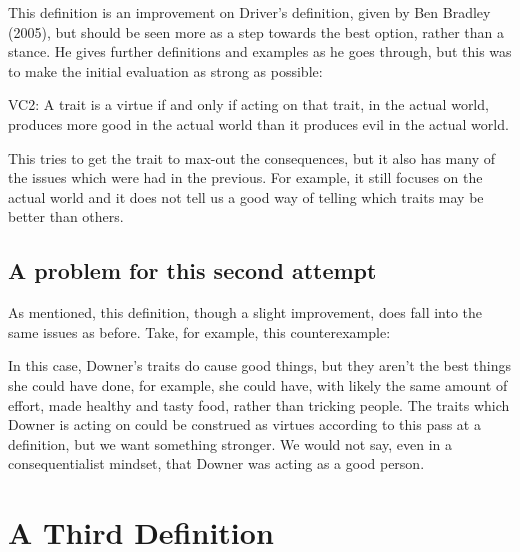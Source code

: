 This definition is an improvement on Driver’s definition, given by Ben Bradley (2005), but should be seen more as a step towards the best option, rather than a stance. He gives further definitions and examples as he goes through, but this was to make the initial evaluation as strong as possible:
\begin{center}
VC2: A trait is a virtue if and only if acting on that trait, in the actual world,  produces more good in the actual world than it produces evil in the actual world.
\end{center}
This tries to get the trait to max-out the consequences, but it also has many of the issues which were had in the previous. For example, it still focuses on the actual world and it does not tell us a good way of telling which traits may be better than others. 

\subsection{A problem for this second attempt}
As mentioned, this definition, though a slight improvement, does fall into the same issues as before. Take, for example, this counterexample:


In this case, Downer’s traits do cause good things, but they aren’t the best things she could have done, for example, she could have, with likely the same amount of effort, made healthy and tasty food, rather than tricking people. The traits which Downer is acting on could be construed as virtues according to this pass at a definition, but we want something stronger. We would not say, even in a consequentialist mindset, that Downer was acting as a good person.

\section{A Third Definition}

